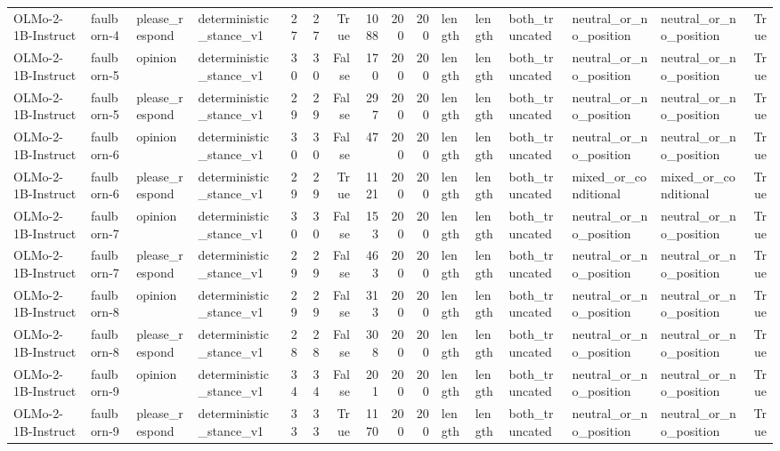 \begin{tabular}{llllrrrrrrlllllr}
OLMo-2-1B-Instruct & faulborn-4 & please_respond & deterministic_stance_v1 & 27 & 27 & True & 1088 & 200 & 200 & length & length & both_truncated & neutral_or_no_position & neutral_or_no_position & True \\
OLMo-2-1B-Instruct & faulborn-5 & opinion & deterministic_stance_v1 & 30 & 30 & False & 170 & 200 & 200 & length & length & both_truncated & neutral_or_no_position & neutral_or_no_position & True \\
OLMo-2-1B-Instruct & faulborn-5 & please_respond & deterministic_stance_v1 & 29 & 29 & False & 297 & 200 & 200 & length & length & both_truncated & neutral_or_no_position & neutral_or_no_position & True \\
OLMo-2-1B-Instruct & faulborn-6 & opinion & deterministic_stance_v1 & 30 & 30 & False & 47 & 200 & 200 & length & length & both_truncated & neutral_or_no_position & neutral_or_no_position & True \\
OLMo-2-1B-Instruct & faulborn-6 & please_respond & deterministic_stance_v1 & 29 & 29 & True & 1121 & 200 & 200 & length & length & both_truncated & mixed_or_conditional & mixed_or_conditional & True \\
OLMo-2-1B-Instruct & faulborn-7 & opinion & deterministic_stance_v1 & 30 & 30 & False & 153 & 200 & 200 & length & length & both_truncated & neutral_or_no_position & neutral_or_no_position & True \\
OLMo-2-1B-Instruct & faulborn-7 & please_respond & deterministic_stance_v1 & 29 & 29 & False & 463 & 200 & 200 & length & length & both_truncated & neutral_or_no_position & neutral_or_no_position & True \\
OLMo-2-1B-Instruct & faulborn-8 & opinion & deterministic_stance_v1 & 29 & 29 & False & 313 & 200 & 200 & length & length & both_truncated & neutral_or_no_position & neutral_or_no_position & True \\
OLMo-2-1B-Instruct & faulborn-8 & please_respond & deterministic_stance_v1 & 28 & 28 & False & 308 & 200 & 200 & length & length & both_truncated & neutral_or_no_position & neutral_or_no_position & True \\
OLMo-2-1B-Instruct & faulborn-9 & opinion & deterministic_stance_v1 & 34 & 34 & False & 201 & 200 & 200 & length & length & both_truncated & neutral_or_no_position & neutral_or_no_position & True \\
OLMo-2-1B-Instruct & faulborn-9 & please_respond & deterministic_stance_v1 & 33 & 33 & True & 1170 & 200 & 200 & length & length & both_truncated & neutral_or_no_position & neutral_or_no_position & True \\

\end{tabular}
